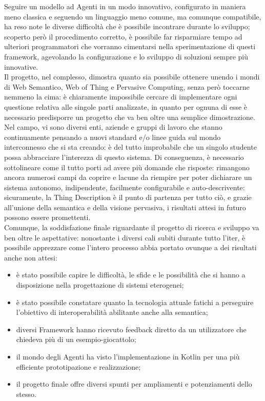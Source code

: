 \documentclass[12pt,a4paper,openright,oneside]{report}
\begin{document}
Seguire un modello ad Agenti in un modo innovativo, configurato in maniera meno classica e seguendo un linguaggio meno comune, ma comunque compatibile, ha reso note le diverse difficoltà che è possibile incontrare durante lo sviluppo; scoperto però il procedimento corretto, è possibile far risparmiare tempo ad ulteriori programmatori che vorranno cimentarsi nella sperimentazione di questi framework, agevolando la configurazione e lo sviluppo di soluzioni sempre più innovative.\\

Il progetto, nel complesso, dimostra quanto sia possibile ottenere unendo i mondi di Web Semantico, Web of Thing e Pervasive Computing, senza però toccarne nemmeno la cima: è chiaramente impossibile cercare di implementare ogni questione relativa alle singole parti analizzate, in quanto per ognuna di esse è necessario predisporre un progetto che va ben oltre una semplice dimostrazione. Nel campo, vi sono diversi enti, aziende e gruppi di lavoro che stanno continuamente pensando a nuovi standard e/o linee guida sul mondo interconnesso che si sta creando: è del tutto improbabile che un singolo studente possa abbracciare l'interezza di questo sistema. Di conseguenza, è necessario sottolineare come il tutto porti ad avere più domande che risposte: rimangono ancora numerosi campi da coprire e lacune da riempire per poter dichiarare un sistema autonomo, indipendente, facilmente configurabile e auto-descrivente: sicuramente, la Thing Description è il punto di partenza per tutto ciò, e grazie all'unione della semantica e della visione pervasiva, i risultati attesi in futuro possono essere promettenti.\\

Comunque, la soddisfazione finale riguardante il progetto di ricerca e sviluppo va ben oltre le aspettative: nonostante i diversi cali subiti durante tutto l'iter, è possibile apprezzare come l'intero processo abbia portato ovunque a dei risultati anche non attesi:

\begin{itemize}
	\item è stato possibile capire le difficoltà, le sfide e le possibilità che si hanno a disposizione nella progettazione di sistemi eterogenei;
	\item è stato possibile constatare quanto la tecnologia attuale fatichi a perseguire l'obiettivo di interoperabilità abilitante anche alla semantica;
	\item diversi Framework hanno ricevuto feedback diretto da un utilizzatore che chiedeva più di un esempio-giocattolo;
	\item il mondo degli Agenti ha visto l'implementazione in Kotlin per una più efficiente prototipazione e realizzazione;
	\item il progetto finale offre diversi spunti per ampliamenti e potenziamenti dello stesso.
\end{itemize}
\end{document}
